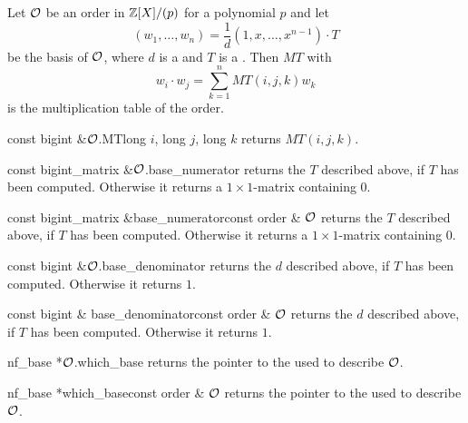 Let $\mathcal{O}$ be an order in $\mathbb{Z}[X] / (p)$ for a polynomial $p$ and let
\begin{displaymath}
  (w_1, \dots, w_n) = \frac{1}{d}(1, x, \dots, x^{n-1}) \cdot T
\end{displaymath}
be the basis of $\mathcal{O}$, where $d$ is a  and $T$ is a .  Then
$MT$ with
\begin{displaymath}
  w_i \cdot w_j = \sum_{k=1}^{n} \mathit{MT}(i,j,k) w_k
\end{displaymath}
is the multiplication table of the order.

\begin{cfcode}{const bigint &}{$\mathcal{O}$.MT}{long $i$, long $j$, long $k$}
  returns $\mathit{MT}(i,j,k)$.
\end{cfcode}

\begin{cfcode}{const bigint_matrix &}{$\mathcal{O}$.base_numerator}{}
  returns the  $T$ described above, if $T$ has been computed.  Otherwise it
  returns a $1 \times 1$-matrix containing $0$.
\end{cfcode}

\begin{fcode}{const bigint_matrix &}{base_numerator}{const order & $\mathcal{O}$}
  returns the  $T$ described above, if $T$ has been computed.  Otherwise it
  returns a $1 \times 1$-matrix containing $0$.
\end{fcode}

\begin{cfcode}{const bigint &}{$\mathcal{O}$.base_denominator}{}
  returns the  $d$ described above, if $T$ has been computed.  Otherwise it returns
  $1$.
\end{cfcode}

\begin{fcode}{const bigint & }{base_denominator}{const order & $\mathcal{O}$}
  returns the  $d$ described above, if $T$ has been computed.  Otherwise it returns
  $1$.
\end{fcode}

\begin{cfcode}{nf_base *}{$\mathcal{O}$.which_base}{}
  returns the pointer to the  used to describe $\mathcal{O}$.
\end{cfcode}

\begin{fcode}{nf_base *}{which_base}{const order & $\mathcal{O}$}
  returns the pointer to the  used to describe $\mathcal{O}$.
\end{fcode}

